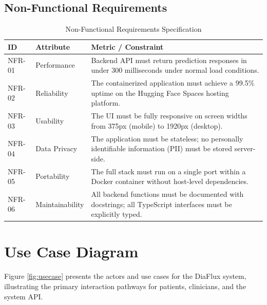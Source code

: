 \documentclass[12pt,a4paper]{report}
\begin{document}
\subsection{Non-Functional Requirements}

\begin{table}[H]
\centering
\caption{Non-Functional Requirements Specification}
\label{tab:non_functional_requirements}
\begin{tabularx}{\textwidth}{llX}
\toprule
\textbf{ID} & \textbf{Attribute} & \textbf{Metric / Constraint} \\
\midrule
NFR-01 & Performance   & Backend API must return prediction responses in under 300 milliseconds under normal load conditions. \\
NFR-02 & Reliability   & The containerized application must achieve a 99.5\% uptime on the Hugging Face Spaces hosting platform. \\
NFR-03 & Usability     & The UI must be fully responsive on screen widths from 375px (mobile) to 1920px (desktop). \\
NFR-04 & Data Privacy  & The application must be stateless; no personally identifiable information (PII) must be stored server-side. \\
NFR-05 & Portability   & The full stack must run on a single port within a Docker container without host-level dependencies. \\
NFR-06 & Maintainability & All backend functions must be documented with docstrings; all TypeScript interfaces must be explicitly typed. \\
\bottomrule
\end{tabularx}
\end{table}

\section{Use Case Diagram}
Figure \ref{fig:usecase} presents the actors and use cases for the DiaFlux system, illustrating the primary interaction pathways for patients, clinicians, and the system API.
\end{document}
